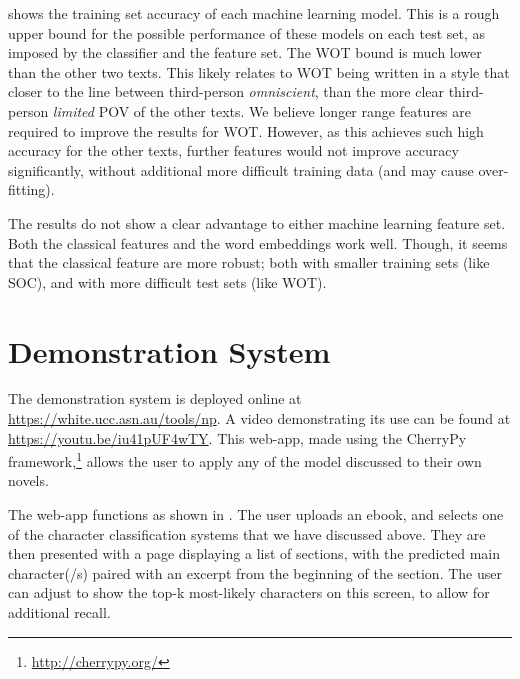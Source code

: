 \documentclass[]{book}
\begin{document}
 shows the training set accuracy of each machine learning model.
This is a rough upper bound for the possible performance of these models on each test set, as imposed by the classifier and the feature set.
The WOT bound is much lower than the other two texts.
This likely relates to WOT being written in a style that closer to the line between third-person \emph{omniscient}, than the more clear third-person \emph{limited} POV of the other texts.
We believe longer range features are required to improve the results for WOT.
However, as this achieves such high accuracy for the other texts, further features would not improve accuracy significantly, without additional more difficult training data (and may cause over-fitting).

%
%
The results do not show a clear advantage to either machine learning feature set.
Both the classical features and the word embeddings work well.
Though, it seems that the classical feature are more robust; both with smaller training sets (like SOC), and with more difficult test sets (like WOT).

\section{Demonstration System}\label{sec:demonstration}
The demonstration system is deployed online at \mbox{\url{https://white.ucc.asn.au/tools/np}}.
A video demonstrating its use can be found at \url{https://youtu.be/iu41pUF4wTY}.
This web-app, made using the CherryPy framework,\footnote{\url{http://cherrypy.org/}}
allows the user to apply any of the model discussed to their own novels.

The web-app functions as shown in .
The user uploads an ebook, and selects one of the character classification systems that we have discussed above.
They are then presented with a page displaying a list of sections,
with the predicted main character(/s) paired with an excerpt from the beginning of the section.
The user can adjust to show the top-k most-likely characters on this screen, to allow for additional recall.
\end{document}
